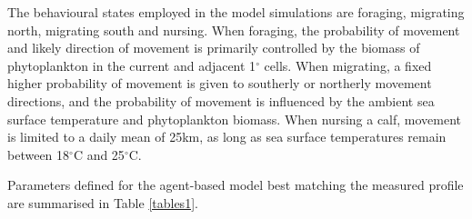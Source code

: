 \documentclass[a4paper,12pt]{article}
\begin{document}
The behavioural states employed in the model simulations are foraging, migrating north, migrating south and nursing. When foraging, the probability of movement and likely direction of movement is primarily controlled by the biomass of phytoplankton in the current and adjacent 1$^{\circ}$ cells. When migrating, a fixed higher probability of movement is given to southerly or northerly movement directions, and the probability of movement is influenced by the ambient sea surface temperature and phytoplankton biomass. When nursing a calf, movement is limited to a daily mean of 25km, as long as sea surface temperatures remain between 18$^{\circ}$C and 25$^{\circ}$C.
 
Parameters defined for the agent-based model best matching the measured profile are summarised in Table \ref{tables1}.

\newpage
\end{document}
